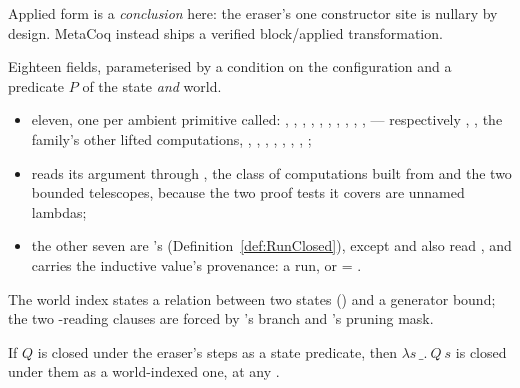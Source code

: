 \begin{remark}
 Applied form is a \emph{conclusion} here: the eraser's one constructor site is nullary
by design. MetaCoq instead ships a verified block/applied transformation.
\end{remark}
\begin{definition}
\label{def:RunClosedW}
\leanok
{}
 Eighteen fields, parameterised by a condition  on the configuration and a
predicate $P$ of the state \emph{and} world.
\begin{itemize}
\item eleven, one per ambient primitive called: , , ,
, , , , , ,
,  --- respectively ,
, the family's other lifted  computations,
, , , ,
, , ,
;
\item {} reads its argument through , the class of computations built from
 and the two bounded telescopes, because the two proof tests it covers are
unnamed lambdas;
\item the other seven are 's (Definition~\ref{def:RunClosed}), except  and
 also read , and  carries the inductive value's provenance: a
 run, or  = .
\end{itemize}
\end{definition}
\begin{remark}
 The world index states a relation between two states () and a generator
bound; the two -reading clauses are forced by 's  branch
and 's pruning mask.
\end{remark}
\begin{lemma}
\label{lem:runClosedW_of_runClosed}
\leanok
{}
 If $Q$ is closed under the eraser's steps as a state predicate, then $\lambda s\,\_.\ Q\ s$
is closed under them as a world-indexed one, at any .
\end{lemma}
